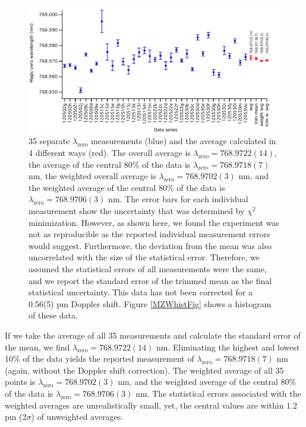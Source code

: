\begin{figure}
\centerline{\includegraphics[width=.90\textwidth]{Figures/MZWmeasurements2.pdf}}
\caption[35 separate $\lambda_\textrm{zero}$ measurements and the average calculated in 4 different ways.]{\label{MZWmeasFig}35 separate $\lambda_\textrm{zero}$ measurements (blue) and the average calculated in 4 different ways (red). The overall average is $\lambda_\textrm{zero}=768.9722(14)$, the average of the central 80\% of the data is $\lambda_\textrm{zero}=768.9718(7)$ nm, the weighted overall average is $\lambda_\textrm{zero}=768.9702(3)$ nm, and the weighted average of the central 80\% of the data is $\lambda_\textrm{zero}=768.9706(3)$ nm. The error bars for each individual measurement show the uncertainty that was determined by $\chi^2$ minimization. However, as shown here, we found the experiment was not as reproducible as the reported individual measurement errors would suggest. Furthermore, the deviation from the mean was also uncorrelated with the size of the statistical error. Therefore, we assumed the statistical errors of all measurements were the same, and we report the standard error of the trimmed mean as the final statistical uncertainty. This data has not been corrected for a 0.56(5) pm Doppler shift. Figure \ref{MZWhistFig} shows a histogram of these data.}
\end{figure}


If we take the average of all 35 measurements and calculate the standard error of the mean, we find $\lambda_\textrm{zero}=768.9722(14)$ nm. Eliminating the highest and lowest 10\% of the data yields the reported measurement of $\lambda_\textrm{zero}=768.9718(7)$ nm (again, without the Doppler shift correction). The weighted average of all 35 points is $\lambda_\textrm{zero}=768.9702(3)$ nm, and the weighted average of the central 80\% of the data is $\lambda_\textrm{zero}=768.9706(3)$ nm. The statistical errors associated with the weighted averages are unrealistically small, yet, the central values are within 1.2 pm (2$\sigma$) of unweighted averages. 

